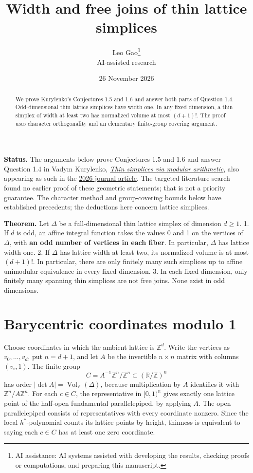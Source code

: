 \documentclass[11pt]{article}
\title{\textcolor{ink}{Width and free joins of thin lattice simplices}}
\author{Leo Gao\thanks{AI assistance: AI systems assisted with developing the results, checking proofs or computations, and preparing this manuscript.}\\[3pt]\small\textsf{AI-assisted research}}
\date{26 November 2026}
\begin{document}
\maketitle
\begin{abstract}
We prove Kurylenko’s Conjectures 1.5 and 1.6 and answer both parts of Question 1.4. Odd-dimensional thin lattice simplices have width one. In any fixed dimension, a thin simplex of width at least two has normalized volume at most \((d+1)!\). The proof uses character orthogonality and an elementary finite-group covering argument.
\end{abstract}
\textbf{Status.} The arguments below prove Conjectures 1.5 and 1.6 and answer Question 1.4 in Vadym Kurylenko, \href{https://arxiv.org/html/2404.03975v2\#S1.SS4}{\emph{Thin simplices via modular arithmetic}}, also appearing as such in the \href{https://doi.org/10.5070/C6.68698}{2026 journal article}. The targeted literature search found no earlier proof of these geometric statements; that is not a priority guarantee. The character method and group-covering bounds below have established precedents; the deductions here concern lattice simplices.

\textbf{Theorem.} Let \(\Delta\) be a full-dimensional thin lattice simplex of dimension \(d\ge 1\).
1. If \(d\) is odd, an affine integral function takes the values 0 and 1 on the vertices of \(\Delta\), with \textbf{an odd number of vertices in each fiber}. In particular, \(\Delta\) has lattice width one.
2. If \(\Delta\) has lattice width at least two, its normalized volume is at most \((d+1)!\). In particular, there are only finitely many such simplices up to affine unimodular equivalence in every fixed dimension.
3. In each fixed dimension, only finitely many spanning thin simplices are not free joins. None exist in odd dimensions.

\section{Barycentric coordinates modulo 1}\label{barycentric-coordinates-modulo-1}

Choose coordinates in which the ambient lattice is \(\mathbb Z^d\). Write the vertices as \(v_0,\dots,v_d\), put \(n=d+1\), and let \(A\) be the invertible \(n\times n\) matrix with columns \((v_i,1)\). The finite group
\[
C=A^{-1}\mathbb Z^n/\mathbb Z^n\subset (\mathbb R/\mathbb Z)^n
\]
has order \(|\det A|=\operatorname{Vol}_{\mathbb Z}(\Delta)\), because multiplication by \(A\) identifies it with \(\mathbb Z^n/A\mathbb Z^n\). For each \(c\in C\), the representative in \([0,1)^n\) gives exactly one lattice point of the half-open fundamental parallelepiped, by applying \(A\). The open parallelepiped consists of representatives with every coordinate nonzero. Since the local \(h^*\)-polynomial counts its lattice points by height, thinness is equivalent to saying each \(c\in C\) has at least one zero coordinate.
\end{document}
